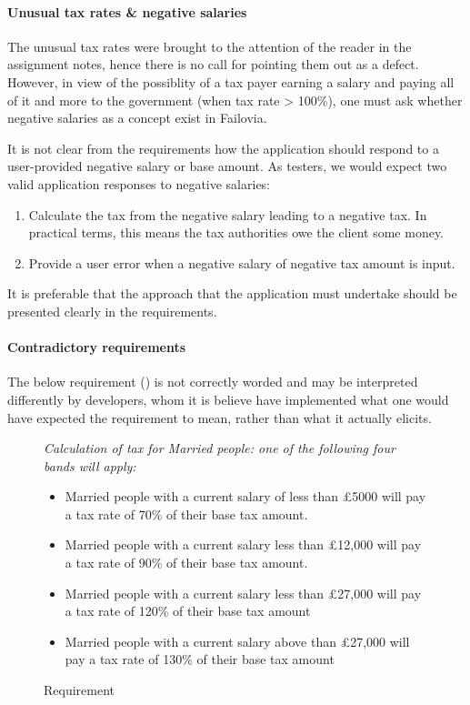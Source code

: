 \paragraph{Unusual tax rates \& negative salaries}
The unusual tax rates were brought to the attention of the reader in the assignment notes, hence there is no call for pointing them out as a defect. However, in view of the possiblity of a tax payer earning a salary and paying all of it and more to the government (when tax rate > 100\%), one must ask whether negative salaries as a concept exist in Failovia. 
\par
It is not clear from the requirements how the application should respond to a user-provided negative salary or base amount. As testers, we would expect two valid application responses to negative salaries: 

\begin{enumerate}
	\item Calculate the tax from the negative salary leading to a negative tax. In practical terms, this means the tax authorities owe the client some money.
	\item Provide a user error when a negative salary of negative tax amount is input. 
\end{enumerate}

It is preferable that the approach that the application must undertake should be presented clearly in the requirements.

\paragraph{Contradictory requirements}
The below requirement (\REightFive) is not correctly worded and may be interpreted differently by developers, whom it is believe have implemented what one would have expected the requirement to mean, rather than what it actually elicits. 
\par
\begin{figure}[H]
\begin{mdframed}
{
\it
\footnotesize
Calculation of tax for Married people: one of the following four bands will apply:
\begin{itemize}
	\item Married people with a current salary of less than £5000 will pay a tax rate of
	70\% of their base tax amount.
	\item Married people with a current salary less than £12,000 will pay a tax rate of
	90\% of their base tax amount.
	\item Married people with a current salary less than £27,000 will pay a tax rate of
	120\% of their base tax amount
	\item Married people with a current salary above than £27,000 will pay a tax rate
	of 130\% of their base tax amount
\end{itemize}	
}
\end{mdframed}
\caption{Requirement \REightFive}
\end{figure} 



